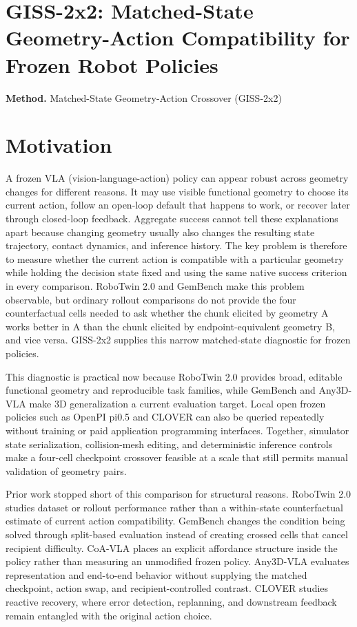 \documentclass[10pt,a4paper]{article}
\begin{document}
\section*{GISS-2x2: Matched-State Geometry-Action Compatibility for Frozen Robot Policies}
\textbf{Method.} Matched-State Geometry-Action Crossover (GISS-2x2)
\section*{Motivation}
A frozen VLA (vision-language-action) policy can appear robust across geometry changes for different reasons. It may use visible functional geometry to choose its current action, follow an open-loop default that happens to work, or recover later through closed-loop feedback. Aggregate success cannot tell these explanations apart because changing geometry usually also changes the resulting state trajectory, contact dynamics, and inference history. The key problem is therefore to measure whether the current action is compatible with a particular geometry while holding the decision state fixed and using the same native success criterion in every comparison. RoboTwin 2.0 and GemBench make this problem observable, but ordinary rollout comparisons do not provide the four counterfactual cells needed to ask whether the chunk elicited by geometry A works better in A than the chunk elicited by endpoint-equivalent geometry B, and vice versa. GISS-2x2 supplies this narrow matched-state diagnostic for frozen policies.

This diagnostic is practical now because RoboTwin 2.0 provides broad, editable functional geometry and reproducible task families, while GemBench and Any3D-VLA make 3D generalization a current evaluation target. Local open frozen policies such as OpenPI pi0.5 and CLOVER can also be queried repeatedly without training or paid application programming interfaces. Together, simulator state serialization, collision-mesh editing, and deterministic inference controls make a four-cell checkpoint crossover feasible at a scale that still permits manual validation of geometry pairs.

Prior work stopped short of this comparison for structural reasons. RoboTwin 2.0 studies dataset or rollout performance rather than a within-state counterfactual estimate of current action compatibility. GemBench changes the condition being solved through split-based evaluation instead of creating crossed cells that cancel recipient difficulty. CoA-VLA places an explicit affordance structure inside the policy rather than measuring an unmodified frozen policy. Any3D-VLA evaluates representation and end-to-end behavior without supplying the matched checkpoint, action swap, and recipient-controlled contrast. CLOVER studies reactive recovery, where error detection, replanning, and downstream feedback remain entangled with the original action choice.
\end{document}
